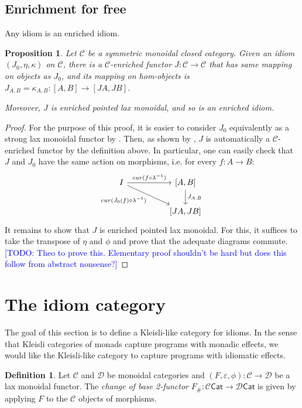 \documentclass{article}
\newtheorem{prop}[thm]{Proposition}
\theoremstyle{definition}
\newtheorem{defn}[thm]{Definition}
\theoremstyle{remark}
\newcommand{\todo}[1]{\textcolor{blue}{[TODO: #1]}}
\newcommand{\CCat}{\mathcal{C}}
\newcommand{\DCat}{\mathcal{D}}
\newcommand{\Cat}{\mathsf{Cat}}
\newcommand{\unit}{\eta}
\begin{document}
\subsection{Enrichment for free}

Any idiom is an enriched idiom.

\begin{prop}
  Let $\CCat$ be a symmetric monoidal closed category. Given an idiom $(J_0, \unit, \kappa)$ on $\CCat$,
  there is a $\CCat$-enriched functor $J : \CCat \to \CCat$ that has same mapping on objects
  as $J_0$, and its mapping on hom-objects is $J_{A,B} = \kappa_{A,B}: [A,B] \to [JA, JB]$.

  Moreover, $J$ is enriched pointed lax monoidal, and so is an enriched idiom.
\end{prop}

\begin{proof}
  For the purpose of this proof, it is easier to consider $J_0$ equivalently as a strong lax monoidal functor by .
  Then, as shown by \cite{kock-strong-functors}, $J$ is automatically a $\CCat$-enriched functor by the definition above.
  In particular, one can easily check that $J$ and $J_0$ have the same action on morphisms, i.e. for every $f: A \to B$:
  \[
  \begin{tikzcd}
    I && {[A,B]} \\
    && {[JA, JB]}
    \arrow["{cur(f\circ \lambda^{-1})}", from=1-1, to=1-3]
    \arrow["{cur(J_0(f)\circ \lambda^{-1})}"', from=1-1, to=2-3]
    \arrow["{J_{A,B}}", from=1-3, to=2-3]
  \end{tikzcd}
  \]
  It remains to show that $J$ is enriched pointed lax monoidal.
  For this, it suffices to take the transpose of $\eta$ and $\phi$ and prove that the adequate diagrams commute.
  \todo{Theo to prove this. Elementary proof shouldn't be hard but does this follow from abstract nonsense?}
\end{proof}

\section{The idiom category}

The goal of this section is to define a Kleisli-like category for idioms.
In the sense that Kleisli categories of monads capture programs with monadic effects, we would like the Kleisli-like category to capture programs with idiomatic effects.

\begin{defn}
  Let $\CCat$ and $\DCat$ be monoidal categories and $(F, \varepsilon, \phi): \CCat \to \DCat$ be a lax monoidal functor. The \emph{change of base 2-functor}
  $F_\# : \CCat\Cat \to \DCat\Cat$ is given by applying $F$ to the $\CCat$ objects of morphisms.
\end{defn}
\end{document}

